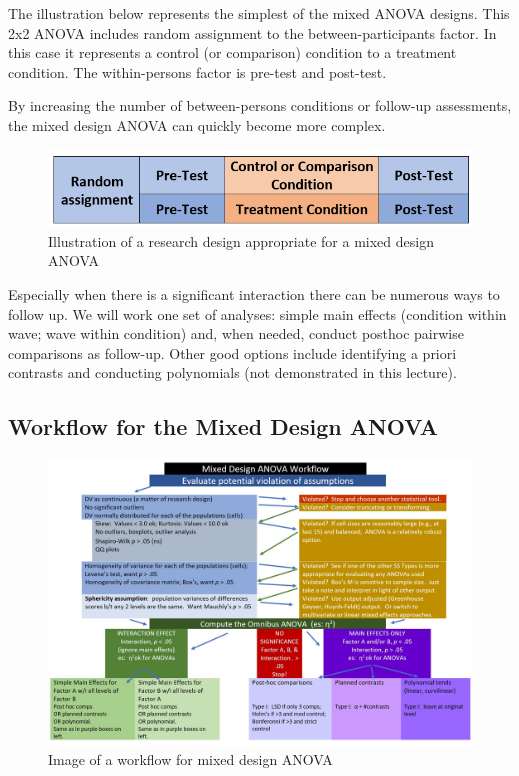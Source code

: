 \documentclass[
  11pt,
]{book}
\begin{document}
The illustration below represents the simplest of the mixed ANOVA designs. This 2x2 ANOVA includes random assignment to the between-participants factor. In this case it represents a control (or comparison) condition to a treatment condition. The within-persons factor is pre-test and post-test.

By increasing the number of between-persons conditions or follow-up assessments, the mixed design ANOVA can quickly become more complex.

\begin{figure}
\centering
\includegraphics{images/mixed/MixedDesign.png}
\caption{Illustration of a research design appropriate for a mixed design ANOVA}
\end{figure}

Especially when there is a significant interaction there can be numerous ways to follow up. We will work one set of analyses: simple main effects (condition within wave; wave within condition) and, when needed, conduct posthoc pairwise comparisons as follow-up. Other good options include identifying a priori contrasts and conducting polynomials (not demonstrated in this lecture).

\hypertarget{workflow-for-the-mixed-design-anova}{%
\subsection{Workflow for the Mixed Design ANOVA}\label{workflow-for-the-mixed-design-anova}}

\begin{figure}
\centering
\includegraphics{images/mixed/mx_workflow.jpg}
\caption{Image of a workflow for mixed design ANOVA}
\end{figure}
\end{document}
